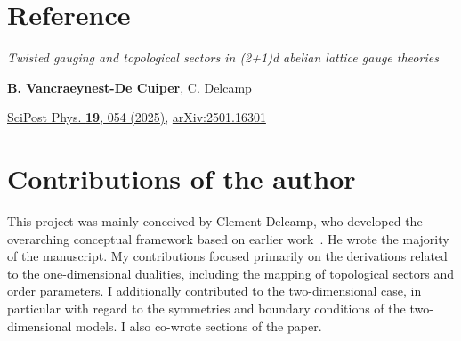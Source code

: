 \section{Reference}
\textit{Twisted gauging and topological sectors in (2+1)d abelian lattice gauge theories} \par\noindent
\textbf{B. Vancraeynest-De Cuiper}, C. Delcamp \par\noindent
\href{https:/doi.org/10.21468/SciPostPhys.19.2.054}{SciPost Phys. \textbf{19}, 054 (2025)}, \href{https://doi.org/10.48550/arXiv.2501.16301}{arXiv:2501.16301}
\section{Contributions of the author}
This project was mainly conceived by Clement Delcamp, who developed the overarching conceptual framework based on earlier work~\cite{Delcamp2021,Delcamp2023}. He wrote the majority of the manuscript. My contributions focused primarily on the derivations related to the one-dimensional dualities, including the mapping of topological sectors and order parameters. I additionally contributed to the two-dimensional case, in particular with regard to the symmetries and boundary conditions of the two-dimensional models. I also co-wrote sections of the paper.
%
